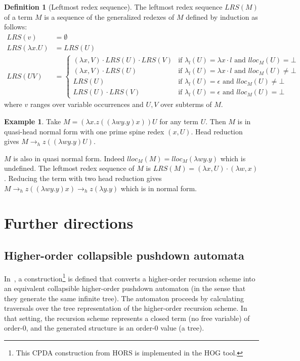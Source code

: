 \documentclass{article}
\theoremstyle{definition}
\newtheorem{definition}{Definition}[section]
\newtheorem{example}{Example}[section]
\begin{document}
\begin{definition}[Leftmost redex sequence]
The leftmost redex sequence $LRS(M)$ of a term $M$ is a sequence of the generalized redexes of $M$ defined by induction as follows:
\begin{align*}
LRS(v) &= \emptyset \\
LRS(\lambda x . U) &= LRS(U)\\
LRS(U V) &=
    \begin{cases}
        (\lambda x, V) \cdot LRS(U) \cdot LRS(V) & \mbox{if $\lambda_l(U) = \lambda x \cdot l$ and $lloc_M(U) =\bot$ } \\
        (\lambda x, V) \cdot  LRS(U) & \mbox{if $\lambda_l(U) = \lambda x \cdot l $ and $lloc_M(U) \neq \bot$} \\
        LRS(U) & \mbox{if $\lambda_l(U) = \epsilon$ and $lloc_M(U) \neq \bot$} \\
        LRS(U) \cdot LRS(V) & \mbox{if $\lambda_l(U) = \epsilon$ and $lloc_M(U) = \bot$}
    \end{cases}
\end{align*}
where $v$ ranges over variable occurrences and $U,V$ over subterms of $M$.
\end{definition}

\begin{example}
Take $M = (\lambda x . z ((\lambda w y . y)x)) U$ for any term $U$.
Then $M$ is in quasi-head normal form with one prime spine redex $(x,U)$.
Head reduction gives $M \rightarrow_h z ((\lambda w y. y) U)$.

$M$ is also in quasi normal form. Indeed $lloc_M(M) = lloc_M (\lambda w y . y)$ which is undefined.
The leftmost redex sequence of $M$ is $LRS(M) = (\lambda x, U) \cdot (\lambda w, x)$.
Reducing the term with two head reduction gives
$M \rightarrow_h z ((\lambda w y.y)x) \rightarrow_h z (\lambda y . y)$ which is in normal form.
\end{example}



\section{Further directions}

\subsection{Higher-order collapsible pushdown automata}

In~\cite{Ong2006}, a construction\footnote{This CPDA construction from HORS is implemented in the HOG tool.}
 is defined that converts a higher-order recursion scheme into an equivalent collapsible higher-order pushdown automaton (in the sense that they generate the same infinite tree). The automaton proceeds by calculating traversals over the tree representation of the higher-order recursion scheme. In that setting, the recursion scheme represents a closed term (no free variable) of order-$0$, and the generated structure is an order-$0$ value (a tree).
\end{document}
